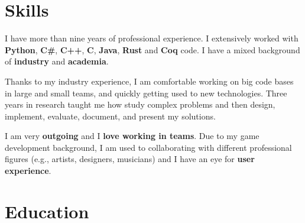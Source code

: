 \documentclass[letterpaper]{twentysecondcv} %
\begin{document}

\makeprofile %


\section{Skills}

I have more than nine years of professional experience. I extensively worked with \textbf{Python}, \textbf{C\#}, \textbf{C++}, \textbf{C}, \textbf{Java}, \textbf{Rust} and \textbf{Coq} code. I have a mixed background of \textbf{industry} and \textbf{academia}.

Thanks to my industry experience, I am comfortable working on big code bases in large and small teams, and quickly getting used to new technologies. Three years in research taught me how study complex problems and then design, implement, evaluate, document, and present my solutions.

I am very \textbf{outgoing} and I \textbf{love working in teams}. Due to my game development background, I am used to collaborating with different professional figures (e.g., artists, designers, musicians) and I have an eye for \textbf{user experience}.\\

\section{Education}

\begin{twenty} %
\end{twenty}

\end{document}
